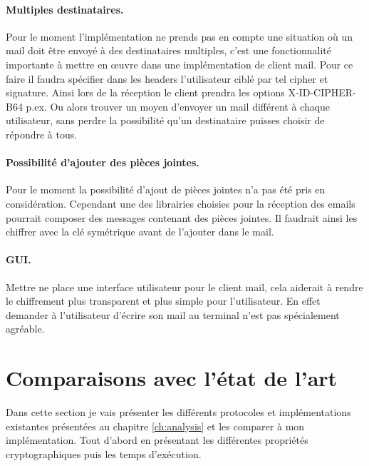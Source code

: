 \paragraph*{Multiples destinataires.}
Pour le moment l'implémentation ne prends pas en compte une situation où un mail doit être envoyé à des destinataires multiples, c'est une fonctionnalité importante à mettre en œuvre dans une implémentation de client mail. Pour ce faire il faudra spécifier dans les headers l'utilisateur ciblé par tel cipher et signature. Ainsi lors de la réception le client prendra les options X-ID-CIPHER-B64 p.ex. Ou alors trouver un moyen d'envoyer un mail différent à chaque utilisateur, sans perdre la possibilité qu'un destinataire puisses choisir de répondre à tous.
\paragraph*{Possibilité d'ajouter des pièces jointes.}
Pour le moment la possibilité d'ajout de pièces jointes n'a pas été pris en considération. Cependant une des librairies choisies pour la réception des emails pourrait composer des messages contenant des pièces jointes. Il faudrait ainsi les chiffrer avec la clé symétrique avant de l'ajouter dans le mail.
\paragraph*{GUI.}
Mettre ne place une interface utilisateur pour le client mail, cela aiderait à rendre le chiffrement plus transparent et plus simple pour l'utilisateur. En effet demander à l'utilisateur d'écrire son mail au terminal n'est pas spécialement agréable.
\section{Comparaisons avec l'état de l'art}
Dans cette section je vais présenter les différents protocoles et implémentations existantes présentées au chapitre \ref{ch:analysis} et les comparer à mon implémentation. Tout d'abord en présentant les différentes propriétés cryptographiques puis les temps d'exécution.

